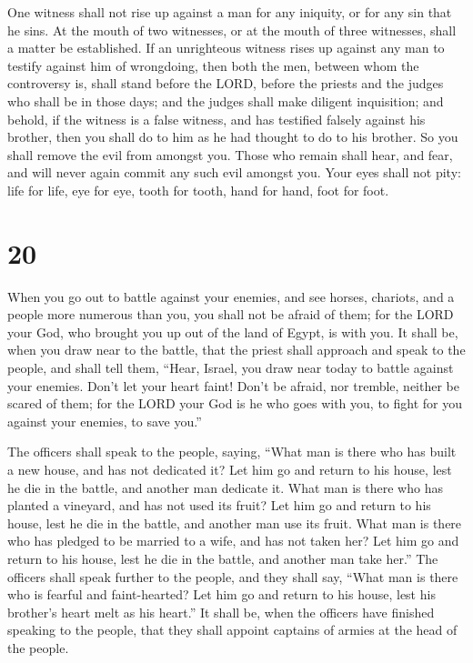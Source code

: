  One witness shall not rise up against a man for any
iniquity, or for any sin that he sins. At the mouth of two witnesses, or
at the mouth of three witnesses, shall a matter be established.
 If an unrighteous witness rises up against any man to
testify against him of wrongdoing,  then both the men,
between whom the controversy is, shall stand before the LORD, before the
priests and the judges who shall be in those days;  and
the judges shall make diligent inquisition; and behold, if the witness
is a false witness, and has testified falsely against his brother,
 then you shall do to him as he had thought to do to his
brother. So you shall remove the evil from amongst you. 
Those who remain shall hear, and fear, and will never again commit any
such evil amongst you.  Your eyes shall not pity: life
for life, eye for eye, tooth for tooth, hand for hand, foot for foot.

\hypertarget{section-19}{%
\section{20}\label{section-19}}

 When you go out to battle against your enemies, and see
horses, chariots, and a people more numerous than you, you shall not be
afraid of them; for the LORD your God, who brought you up out of the
land of Egypt, is with you.  It shall be, when you draw
near to the battle, that the priest shall approach and speak to the
people,  and shall tell them, ``Hear, Israel, you draw
near today to battle against your enemies. Don't let your heart faint!
Don't be afraid, nor tremble, neither be scared of them; 
for the LORD your God is he who goes with you, to fight for you against
your enemies, to save you.''

 The officers shall speak to the people, saying, ``What
man is there who has built a new house, and has not dedicated it? Let
him go and return to his house, lest he die in the battle, and another
man dedicate it.  What man is there who has planted a
vineyard, and has not used its fruit? Let him go and return to his
house, lest he die in the battle, and another man use its fruit.
 What man is there who has pledged to be married to a
wife, and has not taken her? Let him go and return to his house, lest he
die in the battle, and another man take her.''  The
officers shall speak further to the people, and they shall say, ``What
man is there who is fearful and faint-hearted? Let him go and return to
his house, lest his brother's heart melt as his heart.'' 
It shall be, when the officers have finished speaking to the people,
that they shall appoint captains of armies at the head of the people.


